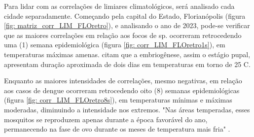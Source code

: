 

\indent Para lidar com as correlações de limiares climatológicos, será analisado cada cidade separadamente. Começando pela capital do Estado, Florianópolis (figura \ref{fig: matriz_corr_LIM_FLOretro}), e analisando o ano de 2023, pode-se verificar que as maiores correlações em relação aos focos de  sp. ocorreram retrocedendo uma (1) semana epidemiológica (figura \ref{fig: corr_LIM_FLOretro1s}), em temperaturas máximas amenas.  citam que a embriogênese, assim o estágio pupal, apresentam duração aproximada de dois dias em temperaturas em torno de 25 C.

\indent Enquanto as maiores intensidades de correlações, mesmo negativas, em relação aos casos de dengue ocorreram retrocedendo oito (8) semanas epidemiológicas (figura \ref{fig: corr_LIM_FLOretro8s}), em temperaturas mínimas e máximas moderadas, diminuindo a intensidade nos extremos. "Nas áreas temperadas, esses mosquitos se reproduzem apenas durante a época favorável do ano, permanecendo na fase de ovo durante os meses de temperatura mais fria" \cite{Valle2015Dengue}.


